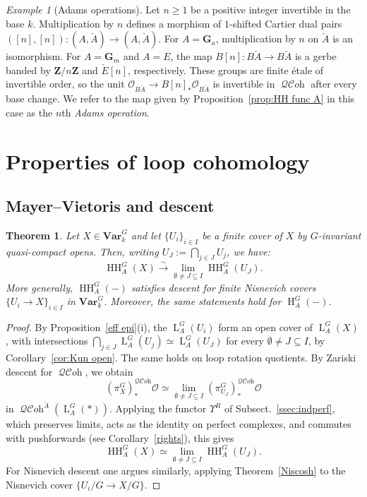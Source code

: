 \documentclass[12pt, oneside]{amsart}
\numberwithin{equation}{section}
\newtheorem{theorem}[subsubsection]{Theorem}
\theoremstyle{remark}
\newtheorem{example}[subsubsection]{Example}
\theoremstyle{plain}
\renewcommand{\geq}{\geqslant}
\DeclareMathOperator{\QCOH}{\mathcal{QC}\textit{oh}}
\newcommand{\Loop}{\operatorname{L}}
\newcommand{\OO}{\mathcal{O}}
\newcommand{\GGa}{\mathbf{G}_{a}}
\newcommand{\GGm}{\mathbf{G}_{m}}
\newcommand{\Ren}{\Upsilon}
\newcommand{\Var}{\mathbf{Var}_{k}}
\newcommand{\HH}{\operatorname{HH}}
\newcommand{\Hcoh}{\operatorname{H}}
\begin{document}
\begin{example}[Adams operations]\label{exam:Adams}
Let $n\geq 1$ be a positive integer invertible in the base $k$.
Multiplication by $n$ defines a morphism of $1$-shifted Cartier dual pairs $([n],[n]) : (A, \check{A}) \to (A, \check{A})$.
For $A=\GGa$, multiplication by $n$ on $\check{A}$ is an isomorphism.
For $A=\GGm$ and $A=E$, the map $B[n]:B\check{A}\to B\check{A}$ is a gerbe banded by $\mathbf{Z}/n\mathbf{Z}$ and $\check{E}[n]$, respectively.
These groups are finite étale of invertible order, so the unit $\OO_{B\check{A}} \to B[n]_*\OO_{B\check{A}}$ is invertible in $\QCOH$ after every base change.
We refer to the map given by Proposition~\ref{prop:HH func A} in this case as the $n$th \emph{Adams operation}.
\end{example}

\section{Properties of loop cohomology}\label{sec:coh properties}

\subsection{Mayer--Vietoris and descent}\label{ssec:coh descent}

\begin{theorem}\label{thm:coh MV}
Let $X \in \Var^G$ and let $\{U_i\}_{i\in I}$ be a finite cover of $X$ by $G$-invariant quasi-compact opens.
Then, writing $U_J := \bigcap_{j\in J} U_j$, we have:
$$\HH_A^G(X)\xrightarrow{\sim} \lim_{\emptyset\neq J\subseteq I}\HH_A^G(U_J).$$
More generally, $\HH_A^G(-)$ satisfies descent for finite Nisnevich covers $\{U_i \to X\}_{i\in I}$ in $\Var^G$.
Moreover, the same statements hold for $\Hcoh_A^G(-)$.
\end{theorem}

\begin{proof}
By Proposition~\ref{eff epi}(i), the $\Loop_A^G(U_i)$ form an open cover of $\Loop_A^G(X)$, with intersections $\bigcap_{j\in J}\Loop_A^G(U_j) \simeq \Loop_A^G(U_J)$ for every $\emptyset\neq J\subseteq I$, by Corollary~\ref{cor:Kun open}.
The same holds on loop rotation quotients.
By Zariski descent for $\QCOH$, we obtain
$$ (\pi_X^G)_*^{\QCOH}\OO \simeq \lim_{\emptyset\neq J\subseteq I}(\pi_{U_J}^G)_*^{\QCOH}\OO $$
in $\QCOH^{\check{A}}(\Loop_A^G(*))$.
Applying the functor $\Ren^R$ of Subsect.~\ref{ssec:indperf}, which preserves limits, acts as the identity on perfect complexes, and commutes with pushforwards (see Corollary~\ref{rights}), this gives
$$ \HH_A^G(X)\simeq \lim_{\emptyset\neq J\subseteq I}\HH_A^G(U_J). $$
For Nisnevich descent one argues similarly, applying Theorem~\ref{Niscosh} to the Nisnevich cover $\{U_i/G\to X/G\}$.
\end{proof}
\end{document}
